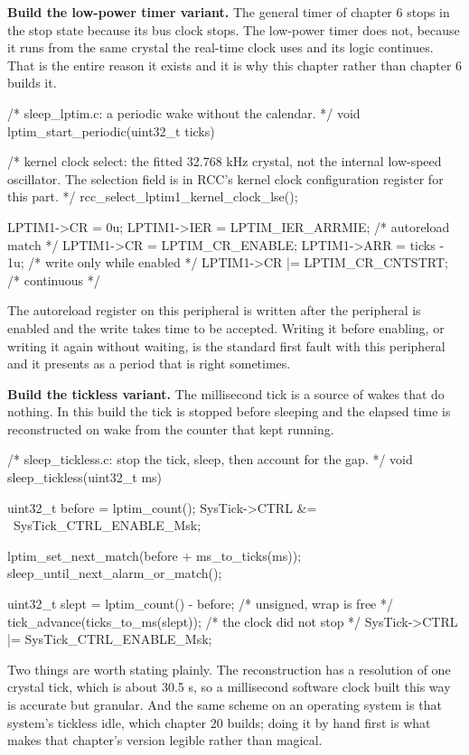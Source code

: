 \begin{steps}
\item \textbf{Build the low-power timer variant.} The general timer of chapter 6
stops in the stop state because its bus clock stops. The low-power timer does
not, because it runs from the same crystal the real-time clock uses and its
logic continues. That is the entire reason it exists and it is why this chapter
rather than chapter 6 builds it.
\begin{ccode}
/* sleep_lptim.c: a periodic wake without the calendar. */
void lptim_start_periodic(uint32_t ticks)
{
    /* kernel clock select: the fitted 32.768 kHz crystal, not the internal
       low-speed oscillator. The selection field is in RCC's kernel clock
       configuration register for this part. */
    rcc_select_lptim1_kernel_clock_lse();

    LPTIM1->CR  = 0u;
    LPTIM1->IER = LPTIM_IER_ARRMIE;         /* autoreload match */
    LPTIM1->CR  = LPTIM_CR_ENABLE;
    LPTIM1->ARR = ticks - 1u;               /* write only while enabled */
    LPTIM1->CR |= LPTIM_CR_CNTSTRT;         /* continuous */
}
\end{ccode}
The autoreload register on this peripheral is written after the peripheral is
enabled and the write takes time to be accepted. Writing it before enabling, or
writing it again without waiting, is the standard first fault with this
peripheral and it presents as a period that is right sometimes.

\item \textbf{Build the tickless variant.} The millisecond tick is a source of
wakes that do nothing. In this build the tick is stopped before sleeping and
the elapsed time is reconstructed on wake from the counter that kept running.
\begin{ccode}
/* sleep_tickless.c: stop the tick, sleep, then account for the gap. */
void sleep_tickless(uint32_t ms)
{
    uint32_t before = lptim_count();
    SysTick->CTRL &= ~SysTick_CTRL_ENABLE_Msk;

    lptim_set_next_match(before + ms_to_ticks(ms));
    sleep_until_next_alarm_or_match();

    uint32_t slept = lptim_count() - before;        /* unsigned, wrap is free */
    tick_advance(ticks_to_ms(slept));               /* the clock did not stop */
    SysTick->CTRL |= SysTick_CTRL_ENABLE_Msk;
}
\end{ccode}
Two things are worth stating plainly. The reconstruction has a resolution of one
crystal tick, which is about 30.5 \textmu{}s, so a millisecond software clock
built this way is accurate but granular. And the same scheme on an operating
system is that system's tickless idle, which chapter 20 builds; doing it by hand
first is what makes that chapter's version legible rather than magical.


\end{steps}
